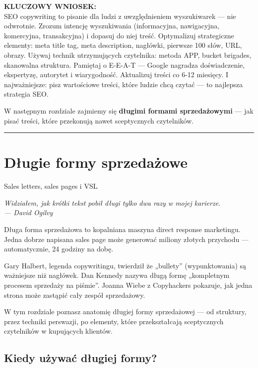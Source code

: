 \documentclass[
  12pt,
  a4paper,
  twoside,
  openright,
  12pt,
  DIV=12,
  BCOR=12mm]{scrbook}
\newcommand{\chapteropener}[1]{%
  \begin{center}
    \large\itshape\color{textmuted}#1
  \end{center}
  \vspace{1em}
}
\newcommand{\decoline}{%
  \begin{center}
    \textcolor{bordergray}{\rule{0.3\textwidth}{0.5pt}}
  \end{center}
}
\newcommand{\takeaway}[1]{%
  \begin{tcolorbox}[
    enhanced,
    colback=accentgreen!10,
    colframe=accentgreen,
    boxrule=0pt,
    borderline south={3pt}{0pt}{accentgreen},
    sharp corners,
    left=15pt, right=15pt, top=10pt, bottom=10pt
  ]
    \textbf{\color{accentgreen}KLUCZOWY WNIOSEK:}\\[5pt]
    #1
  \end{tcolorbox}
}
\begin{document}
\takeaway{SEO copywriting to pisanie dla ludzi z uwzględnieniem wyszukiwarek --- nie odwrotnie. Zrozum intencję wyszukiwania (informacyjna, nawigacyjna, komercyjna, transakcyjna) i dopasuj do niej treść. Optymalizuj strategiczne elementy: meta title tag, meta description, nagłówki, pierwsze 100 słów, URL, obrazy. Używaj technik utrzymujących czytelnika: metoda APP, bucket brigades, skanowalna struktura. Pamiętaj o E-E-A-T --- Google nagradza doświadczenie, ekspertyzę, autorytet i wiarygodność. Aktualizuj treści co 6-12 miesięcy. I najważniejsze: pisz wartościowe treści, które ludzie chcą czytać --- to najlepsza strategia SEO.}

W następnym rozdziale zajmiemy się \textbf{długimi formami
sprzedażowymi} --- jak pisać treści, które przekonują nawet sceptycznych
czytelników.

\decoline


\chapter{Długie formy
sprzedażowe}\label{dux142ugie-formy-sprzedaux17cowe}

Sales letters, sales pages i VSL

\hfill\break

\chapteropener{Widziałem, jak krótki tekst pobił długi tylko dwa razy w mojej karierze.\\--- David Ogilvy}

Długa forma sprzedażowa to kopalniana maszyna direct response
marketingu. Jedna dobrze napisana sales page może generować miliony
złotych przychodu --- automatycznie, 24 godziny na dobę.

Gary Halbert, legenda copywritingu, twierdził że „bullety''
(wypunktowania) są ważniejsze niż nagłówek. Dan Kennedy nazywa długą
formę „kompletnym procesem sprzedaży na piśmie''. Joanna Wiebe z
Copyhackers pokazuje, jak jedna strona może zastąpić cały zespół
sprzedażowy.

W tym rozdziale poznasz anatomię długiej formy sprzedażowej --- od
struktury, przez techniki perswazji, po elementy, które przekształcają
sceptycznych czytelników w kupujących klientów.

\section{Kiedy używać długiej
formy?}\label{kiedy-uux17cywaux107-dux142ugiej-formy}
\end{document}
